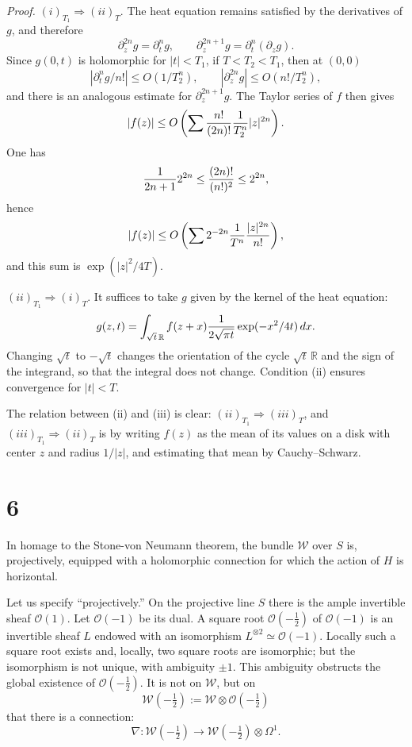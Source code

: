 \documentclass[11pt]{article}
\newcommand{\R}{\mathbb R}
\newcommand{\cO}{\mathcal O}
\newcommand{\cW}{\mathcal W}
\newcommand{\dd}{\,d}
\newcommand{\half}{\tfrac12}
\begin{document}
\emph{Proof.} $(i)_{T_1}\Rightarrow(ii)_T$. The heat equation remains satisfied by the derivatives of $g$, and therefore
\[
\partial_z^{2n}g=\partial_t^n g,
\qquad
\partial_z^{2n+1}g=\partial_t^n(\partial_z g).
\]
Since $g(0,t)$ is holomorphic for $|t|<T_1$, if $T<T_2<T_1$, then at $(0,0)$
\[
|\partial_t^n g/n!|\le O(1/T_2^n),
\qquad
|\partial_z^{2n}g|\le O(n!/T_2^n),
\]
and there is an analogous estimate for $\partial_z^{2n+1}g$. The Taylor series of $f$ then gives
\[
|f(z)|\le O\left(\sum {n!\over(2n)!}{1\over T_2^n}|z|^{2n}\right).
\]
One has
\[
{1\over2n+1}2^{2n}\le{(2n)!\over(n!)^2}\le 2^{2n},
\]
hence
\[
|f(z)|\le O\left(\sum 2^{-2n}{1\over T^n}{|z|^{2n}\over n!}\right),
\]
and this sum is $\exp(|z|^2/4T)$.

$(ii)_{T_1}\Rightarrow(i)_T$. It suffices to take $g$ given by the kernel of the heat equation:
\[
g(z,t)=\int_{\sqrt t\,\R} f(z+x){1\over2\sqrt{\pi t}}\exp(-x^2/4t)\dd x.
\]
Changing $\sqrt t$ to $-\sqrt t$ changes the orientation of the cycle $\sqrt t\,\R$ and the sign of the integrand, so that the integral does not change. Condition (ii) ensures convergence for $|t|<T$.

The relation between (ii) and (iii) is clear: $(ii)_{T_1}\Rightarrow(iii)_T$, and $(iii)_{T_1}\Rightarrow(ii)_T$ is  by writing $f(z)$ as the mean of its values on a disk with center $z$ and radius $1/|z|$, and estimating that mean by Cauchy--Schwarz.

\section*{6}
In homage to the Stone-von Neumann theorem, the bundle $\cW$ over $S$ is, projectively, equipped with a holomorphic connection for which the action of $H$ is horizontal.

Let us specify ``projectively.'' On the projective line $S$ there is the ample invertible sheaf $\cO(1)$. Let $\cO(-1)$ be its dual. A square root $\cO(-\half)$ of $\cO(-1)$ is an invertible sheaf $L$ endowed with an isomorphism $L^{\otimes2}\simeq\cO(-1)$. Locally such a square root exists and, locally, two square roots are isomorphic; but the isomorphism is not unique, with ambiguity $\pm1$. This ambiguity obstructs the global existence of $\cO(-\half)$. It is not on $\cW$, but on
\[
\cW(-\half):=\cW\otimes\cO(-\half)
\]
that there is a connection:
\begin{equation}\tag{6.1}
\nabla:\cW(-\half)\longrightarrow \cW(-\half)\otimes\Omega^1.
\end{equation}
\end{document}
